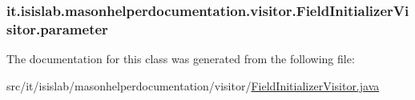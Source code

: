 \hypertarget{classit_1_1isislab_1_1masonhelperdocumentation_1_1visitor_1_1_field_initializer_visitor_a8abd2a44db33a00a74453b99d98d46c2}{
\subsubsection[{parameter}]{ it.\-isislab.\-masonhelperdocumentation.\-visitor.\-Field\-Initializer\-Visitor.\-parameter\hspace{0.3cm}{\ttfamily [private]}}}\label{classit_1_1isislab_1_1masonhelperdocumentation_1_1visitor_1_1_field_initializer_visitor_a8abd2a44db33a00a74453b99d98d46c2}


The documentation for this class was generated from the following file\-:\begin{DoxyCompactItemize}
\item 
src/it/isislab/masonhelperdocumentation/visitor/\hyperlink{_field_initializer_visitor_8java}{Field\-Initializer\-Visitor.\-java}\end{DoxyCompactItemize}
